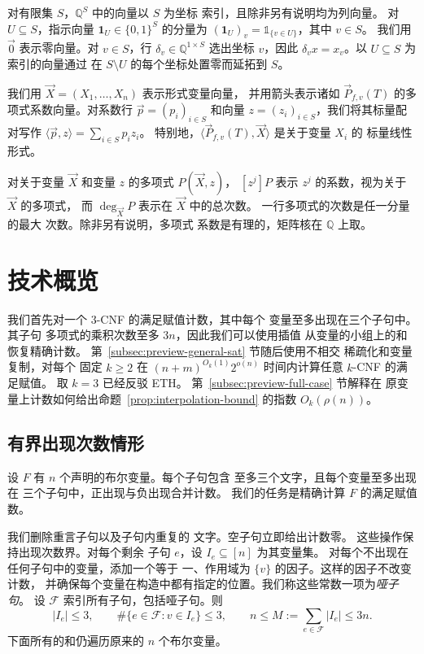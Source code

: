 \documentclass[11pt,reqno]{amsart}
\numberwithin{equation}{section}
\theoremstyle{definition}\newtheorem{definition}[theorem]{定义}
\theoremstyle{remark}\newtheorem{remark}[theorem]{注}
\renewcommand{\le}{\leqslant}
\renewcommand{\ge}{\geqslant}
\begin{document}
对有限集 $S$，$\mathbb Q^S$ 中的向量以 $S$ 为坐标
索引，且除非另有说明均为列向量。
对 $U\subseteq S$，指示向量 $\mathbf1_U\in\{0,1\}^S$
的分量为 $(\mathbf1_U)_v=\mathds{1}_{\{v\in U\}}$，其中 $v\in S$。
我们用 $\vec{0}$ 表示零向量。对 $v\in S$，行
$\delta_v\in\mathbb Q^{1\times S}$ 选出坐标 $v$，因此
$\delta_vx=x_v$。以 $U\subseteq S$ 为索引的向量通过
在 $S\setminus U$ 的每个坐标处置零而延拓到 $S$。

我们用 $\vec{X}=(X_1,\ldots,X_n)$ 表示形式变量向量，
并用箭头表示诸如
$\vec{P}_{f,v}(T)$ 的多项式系数向量。对系数行 $\vec{p}=(p_i)_{i\in S}$
和向量 $z=(z_i)_{i\in S}$，我们将其标量配对写作
$\langle\vec{p},z\rangle=\sum_{i\in S}p_i z_i$。
特别地，$\langle\vec{P}_{f,v}(T),\vec{X}\rangle$ 是关于变量 $X_i$ 的
标量线性形式。

对关于变量 $\vec{X}$ 和变量 $z$ 的多项式 $P(\vec{X},z)$，
$[z^j]P$ 表示 $z^j$ 的系数，视为关于 $\vec{X}$ 的多项式，
而 $\deg_{\vec{X}} P$ 表示在 $\vec{X}$ 中的总次数。
一行多项式的次数是任一分量的最大
次数。除非另有说明，多项式
系数是有理的，矩阵核在
$\mathbb Q$ 上取。

\section{技术概览}\label{sec:technical-overview}
我们首先对一个 $3$-CNF 的满足赋值计数，其中每个
变量至多出现在三个子句中。其子句
多项式的乘积次数至多 $3n$，因此我们可以使用插值
从变量的小组上的和恢复精确计数。
第~\ref{subsec:preview-general-sat} 节随后使用不相交
稀疏化和变量复制，对每个
固定 $k\ge2$ 在 $(n+m)^{O_k(1)}2^{o(n)}$ 时间内计算任意 $k$-CNF 的满足赋值。
取 $k=3$ 已经反驳 ETH。
第~\ref{subsec:preview-full-case} 节解释在
原变量上计数如何给出命题~\ref{prop:interpolation-bound} 的指数 $O_k(\rho(n))$。

\subsection{有界出现次数情形}\label{subsec:preview-setting}
设 $F$ 有 $n$ 个声明的布尔变量。每个子句包含
至多三个文字，且每个变量至多出现在
三个子句中，正出现与负出现合并计数。
我们的任务是精确计算 $F$ 的满足赋值数。

我们删除重言子句以及子句内重复的
文字。空子句立即给出计数零。
这些操作保持出现次数界。对每个剩余
子句 $e$，设 $I_e\subseteq[n]$ 为其变量集。
对每个不出现在任何子句中的变量，添加一个等于
一、作用域为 $\{v\}$ 的因子。这样的因子不改变计数，
并确保每个变量在构造中都有指定的位置。我们称这些常数一项为\emph{哑子句}。
设 $\mathcal F$ 索引所有子句，包括哑子句。则
\begin{equation}\label{eq:overview-incidences}
 |I_e|\le3,\qquad
 \#\{e\in\mathcal F:v\in I_e\}\le3,\qquad
 n\le M:=\sum_{e\in\mathcal F}|I_e|\le3n.
\end{equation}
下面所有的和仍遍历原来的 $n$ 个布尔变量。
\end{document}
